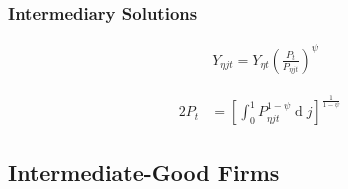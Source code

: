 \documentclass[
	12pt,
	]{article}
\numberwithin{equation}{section}
\DeclareMathOperator{\dif}{d}
\theoremstyle{definition}
\theoremstyle{plain}
\theoremstyle{plain}
\theoremstyle{plain}
\begin{document}

\subsubsection*{Intermediary Solutions}
\begin{align}
	& Y_{\eta jt} = Y_{\eta t} \left( \frac{P_t}{P_{\eta jt}} \right)^{\psi} \label{eq:final-good-firm-FOC}
\end{align}


\begin{alignat}{2}
	P_t & = \left[ \int_{0}^{1} P_{\eta jt}^{1-\psi} \dif j \right]^{\frac{1}{1-\psi}} \label{eq:final-good-firm-markup}
\end{alignat}



\subsection{Intermediate-Good Firms}
\end{document}

